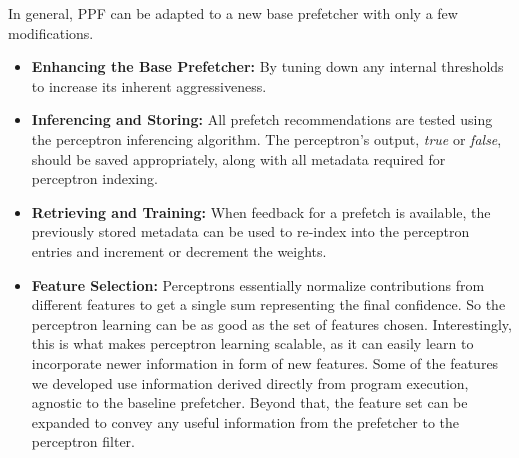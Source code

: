 In general, PPF can be adapted to a new base prefetcher with only a
few modifications.
\begin{itemize}

\item \textbf{Enhancing the Base Prefetcher:} By tuning down any
  internal thresholds to increase its inherent aggressiveness.

\item \textbf{Inferencing and Storing:} All prefetch recommendations
  are tested using the perceptron inferencing algorithm. The
  perceptron's output, \textit{true} or \textit{false}, should be
  saved appropriately, along with all metadata required for perceptron
  indexing.

\item \textbf{Retrieving and Training:} When feedback for a prefetch
  is available, the previously stored metadata can be used to re-index
  into the perceptron entries and increment or decrement the weights.

\item \textbf{Feature Selection:}  Perceptrons essentially normalize
  contributions from different features to get a single sum representing the
  final confidence. So the perceptron learning can be as good as the set of 
  features chosen. Interestingly, this is what makes perceptron learning 
  scalable, as it can easily learn to incorporate newer information in 
  form of new features. Some of the features we developed use information 
  derived directly from program execution, agnostic to the baseline 
  prefetcher. Beyond that, the feature set can be expanded to convey 
  any useful information from the prefetcher to the perceptron filter. 
  


\end{itemize}
